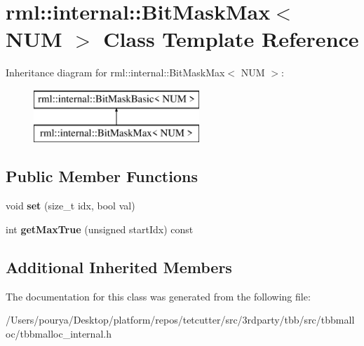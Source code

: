 \hypertarget{classrml_1_1internal_1_1BitMaskMax}{}\section{rml\+:\+:internal\+:\+:Bit\+Mask\+Max$<$ N\+U\+M $>$ Class Template Reference}
\label{classrml_1_1internal_1_1BitMaskMax}
Inheritance diagram for rml\+:\+:internal\+:\+:Bit\+Mask\+Max$<$ N\+U\+M $>$\+:\begin{figure}[H]
\begin{center}
\leavevmode
\includegraphics[height=2.000000cm]{classrml_1_1internal_1_1BitMaskMax}
\end{center}
\end{figure}
\subsection*{Public Member Functions}
\begin{DoxyCompactItemize}
\item 
\hypertarget{classrml_1_1internal_1_1BitMaskMax_a6de0bac734f6bea80b78120dd20255ad}{}void {\bfseries set} (size\+\_\+t idx, bool val)\label{classrml_1_1internal_1_1BitMaskMax_a6de0bac734f6bea80b78120dd20255ad}

\item 
\hypertarget{classrml_1_1internal_1_1BitMaskMax_a78ac32d5a9c09961ed6f957c669c3f10}{}int {\bfseries get\+Max\+True} (unsigned start\+Idx) const \label{classrml_1_1internal_1_1BitMaskMax_a78ac32d5a9c09961ed6f957c669c3f10}

\end{DoxyCompactItemize}
\subsection*{Additional Inherited Members}


The documentation for this class was generated from the following file\+:\begin{DoxyCompactItemize}
\item 
/\+Users/pourya/\+Desktop/platform/repos/tetcutter/src/3rdparty/tbb/src/tbbmalloc/tbbmalloc\+\_\+internal.\+h\end{DoxyCompactItemize}
